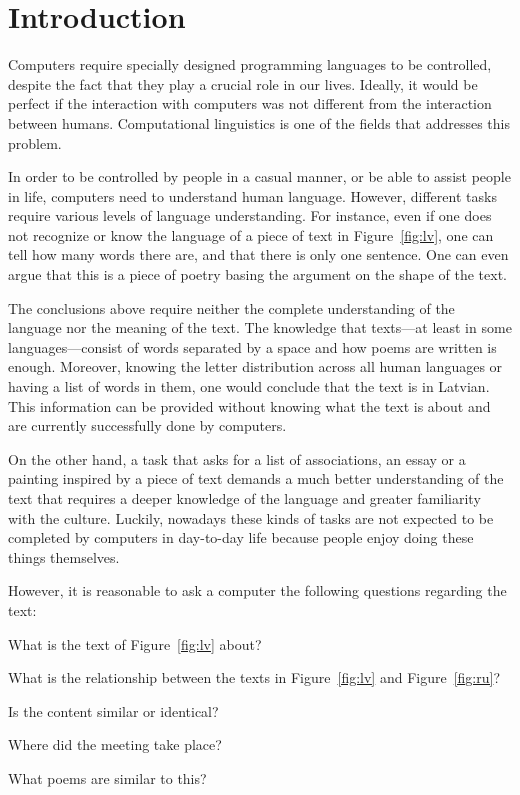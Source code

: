 \chapter{Introduction}
\label{ch:introduction}


Computers require specially designed programming languages to be controlled, despite the fact that they play a crucial role in our lives. Ideally, it would be perfect if the interaction with computers was not different from the interaction between humans. Computational linguistics is one of the fields that addresses this problem.

In order to be controlled by people in a casual manner, or be able to assist people in life, computers need to understand human language. However, different tasks require various levels of language understanding. For instance, even if one does not recognize or know the language of a piece of text in Figure~\ref{fig:lv}, one can tell how many words there are, and that there is only one sentence. One can even argue that this is a piece of poetry basing the argument on the shape of the text.

The conclusions above require neither the complete understanding of the language nor the meaning of the text. The knowledge that texts---at least in some languages---consist of words separated by a space and how poems are written is enough. Moreover, knowing the letter distribution across all human languages or having a list of words in them, one would conclude that the text is in Latvian. This information can be provided without knowing what the text is about and are currently successfully done by computers.



On the other hand, a task that asks for a list of associations, an essay or a painting inspired by a piece of text demands a much better understanding of the text that requires a deeper knowledge of the language and greater familiarity with the culture. Luckily, nowadays these kinds of tasks are not expected to be completed by computers in day-to-day life because people enjoy doing these things themselves.

However, it is reasonable to ask a computer the following questions regarding the text:
\begin{inparaenum}[a)]
\item What is the text of Figure~\ref{fig:lv} about?
\item What is the relationship between the texts in Figure~\ref{fig:lv} and
  Figure~\ref{fig:ru}?
\item Is the content similar or identical?
\item Where did the meeting take place?
\item What poems are similar to this?
\end{inparaenum}

